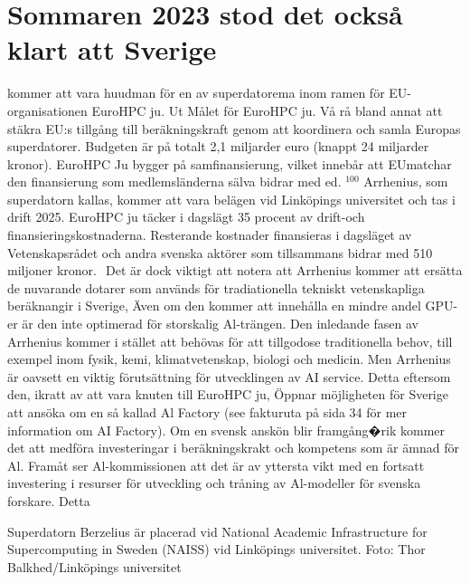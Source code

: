 {{{{{\section*{Sommaren 2023 stod det också klart att Sverige} kommer att vara huudman för en av superdatorema inom ramen för EU-organisationen EuroHPC ju. Ut
Målet för EuroHPC ju. Vå rå bland annat att stäkra EU:s tillgång till beräkningskraft genom att koordinera och samla Europas superdatorer. Budgeten är på totalt 2,1 miljarder euro (knappt 24 miljarder kronor). EuroHPC Ju bygger på samfinansierung, vilket innebår att EUmatchar den finansierung som medlemsländerna sälva bidrar med ed. \({ }^{100}\)
Arrhenius, som superdatorn kallas, kommer att vara belägen vid Linköpings universitet och tas i drift 2025.
EuroHPC ju täcker i dagslägt 35 procent av drift-och finansieringskostnaderna. Resterande kostnader finansieras i dagsläget av Vetenskapsrådet och andra svenska aktörer som tillsammans bidrar med 510 miljoner kronor. \({ }^{}\)
Det är dock viktigt att notera att Arrhenius kommer att ersätta de nuvarande dotarer som används för tradiationella tekniskt vetenskapliga beräknangir i Sverige, Även om den kommer att innehålla en mindre andel GPU-er är den inte optimerad för storskalig Al-trängen. Den inledande fasen av Arrhenius kommer i stället att behövas för att tillgodose traditionella behov, till exempel inom fysik, kemi, klimatvetenskap, biologi och medicin.
Men Arrhenius är oavsett en viktig förutsättning för utvecklingen av AI service. Detta eftersom den, ikratt av att vara knuten till EuroHPC ju, Öppnar möjligheten för Sverige att ansöka om en så kallad Al Factory (see fakturuta på sida 34 för mer information om AI Factory). Om en svensk anskön blir framgång�rik kommer det att medföra investeringar i beräkningskrakt och kompetens som är ämnad för Al.
Framåt ser Al-kommissionen att det är av yttersta vikt med en fortsatt investering i resurser för utveckling och tråning av Al-modeller för svenska forskare. Detta

Superdatorn Berzelius är placerad vid National Academic Infrastructure for Supercomputing in Sweden (NAISS) vid Linköpings universitet. Foto: Thor Balkhed/Linköpings universitet

}}}}}
